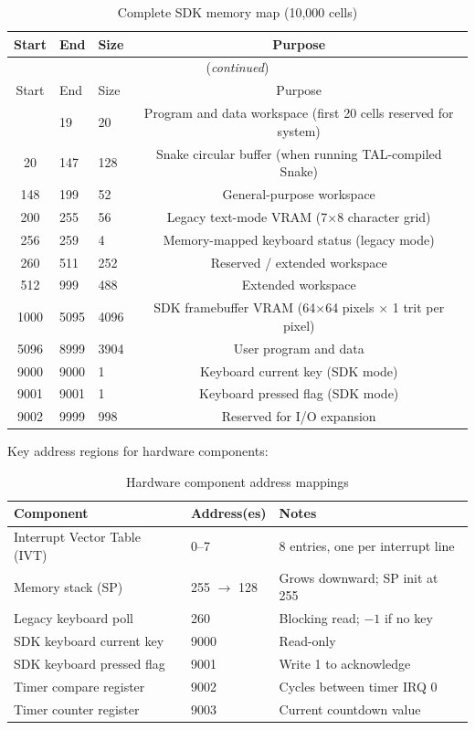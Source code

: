 \documentclass[12pt,a4paper,twoside]{book}
\theoremstyle{trinarytheorem}
\theoremstyle{trinarydefinition}
\begin{document}
\begin{longtable}{cllc}
\caption{Complete SDK memory map (10,000 cells)}
\label{tab:fullmemmap} \\
\toprule
Start & End & Size & Purpose \\
\midrule
\endfirsthead
\multicolumn{4}{c}{(\emph{continued})} \\
\toprule
Start & End & Size & Purpose \\
\midrule
\endhead
\bottomrule
\endfoot
0     & 19   & 20   & Program and data workspace (first 20 cells reserved for system) \\
20    & 147  & 128  & Snake circular buffer (when running TAL-compiled Snake) \\
148   & 199  & 52   & General-purpose workspace \\
200   & 255  & 56   & Legacy text-mode VRAM (7$\times$8 character grid) \\
256   & 259  & 4    & Memory-mapped keyboard status (legacy mode) \\
260   & 511  & 252  & Reserved / extended workspace \\
512   & 999  & 488  & Extended workspace \\
1000  & 5095 & 4096 & SDK framebuffer VRAM (64$\times$64 pixels $\times$ 1 trit per pixel) \\
5096  & 8999 & 3904 & User program and data \\
9000  & 9000 & 1    & Keyboard current key (SDK mode) \\
9001  & 9001 & 1    & Keyboard pressed flag (SDK mode) \\
9002  & 9999 & 998  & Reserved for I/O expansion \\
\bottomrule
\end{longtable}

Key address regions for hardware components:

\begin{table}[H]
\centering
\caption{Hardware component address mappings}
\label{tab:hwaddrmap}
\begin{tabular}{lll}
\toprule
Component & Address(es) & Notes \\
\midrule
Interrupt Vector Table (IVT) & 0--7 & 8 entries, one per interrupt line \\
Memory stack (SP) & 255 $\rightarrow$ 128 & Grows downward; SP init at 255 \\
Legacy keyboard poll & 260 & Blocking read; $-1$ if no key \\
SDK keyboard current key & 9000 & Read-only \\
SDK keyboard pressed flag & 9001 & Write 1 to acknowledge \\
Timer compare register & 9002 & Cycles between timer IRQ 0 \\
Timer counter register & 9003 & Current countdown value \\
\bottomrule
\end{tabular}
\end{table}
\end{document}
